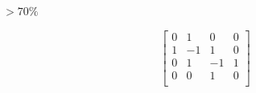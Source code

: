 \documentclass{beamer}
\begin{document}
    \begin{frame}
        \begin{center}
            \fontsize{60}{70}\selectfont \(> 70\%\)
        \end{center}

    \end{frame}

    \begin{frame}
        \HUGE
        \[
            \begin{bmatrix}
                0  &  1  &  0  &  0 \\
                1  & -1  &  1  &  0 \\
                0  &  1  & -1  &  1 \\
                0  &  0  &  1  &  0 \\
            \end{bmatrix}
        \]

    \end{frame}
\end{document}
